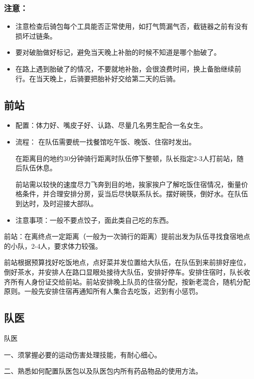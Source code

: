 \documentclass{ctexbook}
\begin{document}
\subsubsection{注意：}
\begin{itemize}
    \item 注意检查后骑包每个工具能否正常使用，如打气筒漏气否，截链器之前有没有损坏过链条。

    \item 要对破胎做好标记，避免当天晚上补胎的时候不知道是哪个胎破了。

    \item 在路上遇到胎破了的情况，不要就地补胎，会很浪费时间，换上备胎继续前行。在当天晚上，后骑要把胎补好交给第二天的后骑。

\end{itemize}

\subsection{前站}
\begin{itemize}
\item 配置：体力好、嘴皮子好、认路、尽量几名男生配合一名女生。
\item 流程：
在队伍需要统一找餐馆吃午饭、晚饭、住宿时发出。

在距离目的地约30分钟骑行距离时队伍停下整顿，队长指定2-3人打前站，随后队伍休息。
 
前站需以较快的速度尽力飞奔到目的地，挨家挨户了解吃饭住宿情况，衡量价格条件，并合理安排分房，妥当后尽快联系队长。摆好碗筷，倒好水。在队伍到达时，及时迎接大部队。

\item 注意事项：一般不要点饺子，面此类自己吃的东西。

\end{itemize}
前站：在离终点一定距离（一般为一次骑行的距离）提前出发为队伍寻找食宿地点的小队，2-4人，要求体力较强。

前站根据预算找好吃饭地点，点好菜并发位置给大队伍，在队伍到来前排好座位，倒好茶水，并安排人在路口显眼处接待大队伍，安排好停车。安排住宿时，队长收齐所有人身份证交给前站。前站安排晚上队员的住宿分配，按新老混合，随机分配原则。一般先安排住宿再通知所有人集合去吃饭，迟到有小惩罚。
\subsection{队医}
队医

一、须掌握必要的运动伤害处理技能，有耐心细心。

二、熟悉如何配置队医包以及队医包内所有药品物品的使用方法。
\end{document}
